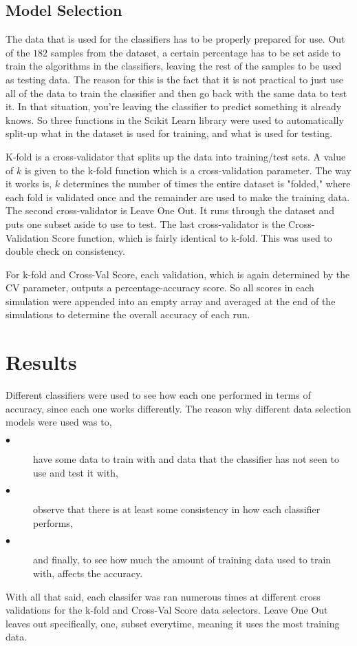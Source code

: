 \documentclass[conference,compsoc]{IEEEtran}
\begin{document}
\subsection{Model Selection}
The data that is used for the classifiers has to be properly prepared for use. Out of the $182$ samples from the dataset, a certain percentage has to be set aside to train the algorithms in the classifiers, leaving the rest of the samples to be used as testing data. The reason for this is the fact that it is not practical to just use all of the data to train the classifier and then go back with the same data to test it. In that situation, you're leaving the classifier to predict something it already knows. 
So three functions in the Scikit Learn library were used to automatically split-up what in the dataset is used for training, and what is used for testing. 

K-fold is a cross-validator that splits up the data into training/test sets. A value of $k$ is given to the k-fold function which is a cross-validation parameter. The way it works is, $k$ determines the number of times the entire dataset is "folded," where each fold is validated once and the remainder are used to make the training data. 
The second cross-validator is Leave One Out. It runs through the dataset and puts one subset aside to use to test. The last cross-validator is the Cross-Validation Score function, which is fairly identical to k-fold. This was used to double check on consistency.

For k-fold and Cross-Val Score, each validation, which is again determined by the CV parameter, outputs a percentage-accuracy score. So all scores in each simulation were appended into an empty array and averaged at the end of the simulations to determine the overall accuracy of each run.

\section{Results}
Different classifiers were used to see how each one performed in terms of accuracy, since each one works differently. The reason why different data selection models 
were used was to,
\begin{description}
	\item[$\bullet$] have some data to train with and data that the classifier has not seen to use and test it with,
	\item[$\bullet$] observe that there is at least some consistency in how each classifier performs,
	\item[$\bullet$] and finally, to see how much the amount of training data used to train with, affects the accuracy.
\end{description}
\noindent With all that said, each classifer was ran numerous times at different cross validations for the k-fold and Cross-Val Score data selectors. Leave One Out leaves out 
specifically, one, subset everytime, meaning it uses the most training data.
\end{document}
